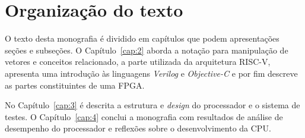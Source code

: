 \section{Organização do texto}
\label{sec:it}

O texto desta monografia é dividido em capítulos que podem apresentações seções e subseções. 
O Capítulo~\ref{cap:2} aborda a notação para manipulação de vetores e conceitos relacionado,
a parte utilizada da arquitetura RISC-V, apresenta uma introdução às linguagens \emph{Verilog}
e \emph{Objective-C} e por fim descreve as partes constituintes de uma FPGA.

No Capítulo~\ref{cap:3} é descrita a estrutura e \emph{design} do processador e o sistema de testes.
O Capítulo~\ref{cap:4} conclui a monografia com resultados de análise de desempenho do processador 
e reflexões sobre o desenvolvimento da CPU.